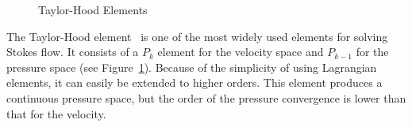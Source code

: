 \begin{figure}
  \caption{Taylor-Hood Elements}
  \label{terrel:fig:THElements}
\end{figure}

The Taylor-Hood element~\cite{Boffi1997,TaylorHood1973} is one of the most widely
used elements for solving Stokes flow.  It consists of a $P_k$ element for the
velocity space and $P_{k-1}$ for the pressure space (see
Figure~\ref{terrel:fig:THElements}).  Because of the simplicity of using Lagrangian
elements, it can easily be extended to higher orders. This element produces a
continuous pressure space, but the order of the pressure convergence is lower
than that for the velocity.

